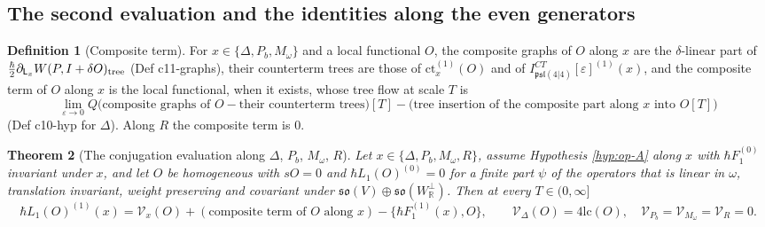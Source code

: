 \documentclass[11pt]{article}
\numberwithin{equation}{section}
\theoremstyle{plain}
\newtheorem{theorem}{Theorem}[section]
\theoremstyle{definition}
\newtheorem{definition}[theorem]{Definition}
\newcommand{\psl}{\mathfrak{psl}(4|4)}
\newcommand{\lc}{\mathrm{lc}}
\newcommand{\ct}{\mathrm{ct}}
\newcommand{\Var}{\mathcal V}
\begin{document}
\subsection{The second evaluation and the identities along the even generators}

\begin{definition}[Composite term]
\label{def:op-compterm}
For $x\in\{\Delta,P_b,M_\omega\}$ and a local functional $O$, the composite graphs of $O$ along $x$ are the $\delta$-linear part of $\tfrac\hbar2\partial_{\mathsf L_x}W(P,I+\delta O)_{\rm tree}$ (Def c11-graphs), their counterterm trees are those of $\ct^{(1)}_x(O)$ and of $I^{CT}_{\psl}[\varepsilon]^{(1)}(x)$, and the composite term of $O$ along $x$ is the local functional, when it exists, whose tree flow at scale $T$ is
\[
\lim_{\varepsilon\to0}Q\big(\text{composite graphs of }O-\text{their counterterm trees}\big)[T]-\big(\text{tree insertion of the composite part along }x\text{ into }O[T]\big)
\]
(Def c10-hyp for $\Delta$). Along $R$ the composite term is $0$.
\end{definition}

\begin{theorem}[The conjugation evaluation along $\Delta$, $P_b$, $M_\omega$, $R$]
\label{thm:op-conj}
Let $x\in\{\Delta,P_b,M_\omega,R\}$, assume Hypothesis \ref{hyp:op-A} along $x$ with $\hbar F_1^{(0)}$ invariant under $x$, and let $O$ be homogeneous with $sO=0$ and $\hbar L_1(O)^{(0)}=0$ for a finite part $\psi$ of the operators that is linear in $\omega$, translation invariant, weight preserving and covariant under $\mathfrak{so}(V)\oplus\mathfrak{so}(W_{\mathbb R}^\perp)$. Then at every $T\in(0,\infty]$
\begin{equation}
\hbar L_1(O)^{(1)}(x)=\Var_x(O)+(\text{composite term of }O\text{ along }x)-\big\{\hbar F_1^{(1)}(x),O\big\},\qquad \Var_\Delta(O)=4\lc(O),\quad\Var_{P_b}=\Var_{M_\omega}=\Var_R=0 .
\label{eq:op-conj}
\end{equation}
\end{theorem}
\end{document}
